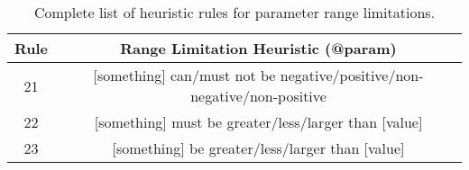 \begin{table}[]
	\begin{tabular}{|c|c|}
		\hline
		\textbf{Rule} & \textbf{Range Limitation Heuristic (@param)} \\ \hline
		21 & [something] can/must {not} be negative/positive/non-negative/non-positive \\ \hline
		22 & [something] must be greater/less/larger than [value] \\ \hline
		23 & [something] be greater/less/larger than [value] \\ \hline
	\end{tabular}
	\caption{Complete list of heuristic rules for parameter range limitations.}
	\label{tab:complete-heuristics-range-limit-param}
\end{table}